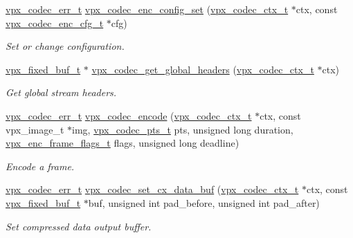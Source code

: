 \begin{DoxyCompactItemize}
\hyperlink{group__codec_gada1084710837ad363b92f2379dd2b8d2}{vpx\-\_\-codec\-\_\-err\-\_\-t} \hyperlink{group__encoder_gabbc036b1fbc1288485df5562a989da9b}{vpx\-\_\-codec\-\_\-enc\-\_\-config\-\_\-set} (\hyperlink{group__codec_gad03e2dfa6ae511db7d25be6bbb336233}{vpx\-\_\-codec\-\_\-ctx\-\_\-t} $\ast$ctx, const \hyperlink{group__encoder_ga946236c809e493b31a815d82db1e59db}{vpx\-\_\-codec\-\_\-enc\-\_\-cfg\-\_\-t} $\ast$cfg)
\begin{DoxyCompactList}\small\item\em \-Set or change configuration. \end{DoxyCompactList}\item 
\hyperlink{group__encoder_ga21fab7dd28065f349c97165501223764}{vpx\-\_\-fixed\-\_\-buf\-\_\-t} $\ast$ \hyperlink{group__encoder_ga512eb105fef18bebb02e134e4cbc82ff}{vpx\-\_\-codec\-\_\-get\-\_\-global\-\_\-headers} (\hyperlink{group__codec_gad03e2dfa6ae511db7d25be6bbb336233}{vpx\-\_\-codec\-\_\-ctx\-\_\-t} $\ast$ctx)
\begin{DoxyCompactList}\small\item\em \-Get global stream headers. \end{DoxyCompactList}\item 
\hyperlink{group__codec_gada1084710837ad363b92f2379dd2b8d2}{vpx\-\_\-codec\-\_\-err\-\_\-t} \hyperlink{group__encoder_gaf990542e2aeb389f05fae3e9c7803639}{vpx\-\_\-codec\-\_\-encode} (\hyperlink{group__codec_gad03e2dfa6ae511db7d25be6bbb336233}{vpx\-\_\-codec\-\_\-ctx\-\_\-t} $\ast$ctx, const vpx\-\_\-image\-\_\-t $\ast$img, \hyperlink{group__encoder_ga7e711b0a71c65aef8f0faea8bd57b05f}{vpx\-\_\-codec\-\_\-pts\-\_\-t} pts, unsigned long duration, \hyperlink{group__encoder_ga99e4a3c966f0de19fe1aa626bd860366}{vpx\-\_\-enc\-\_\-frame\-\_\-flags\-\_\-t} flags, unsigned long deadline)
\begin{DoxyCompactList}\small\item\em \-Encode a frame. \end{DoxyCompactList}\item 
\hyperlink{group__codec_gada1084710837ad363b92f2379dd2b8d2}{vpx\-\_\-codec\-\_\-err\-\_\-t} \hyperlink{group__encoder_gae9f8f75978a1ebcf1f358964b55ecb9e}{vpx\-\_\-codec\-\_\-set\-\_\-cx\-\_\-data\-\_\-buf} (\hyperlink{group__codec_gad03e2dfa6ae511db7d25be6bbb336233}{vpx\-\_\-codec\-\_\-ctx\-\_\-t} $\ast$ctx, const \hyperlink{group__encoder_ga21fab7dd28065f349c97165501223764}{vpx\-\_\-fixed\-\_\-buf\-\_\-t} $\ast$buf, unsigned int pad\-\_\-before, unsigned int pad\-\_\-after)
\begin{DoxyCompactList}\small\item\em \-Set compressed data output buffer. \end{DoxyCompactList}\item 

\end{DoxyCompactItemize}
